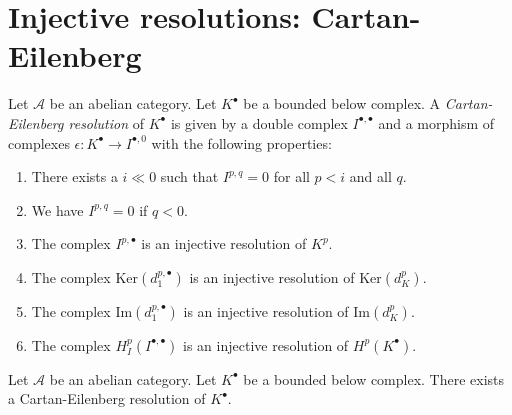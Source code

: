 \section{Injective resolutions: Cartan-Eilenberg}
\label{section-cartan-eilenberg}

\begin{definition}
\label{definition-cartan-eilenberg}
Let $\mathcal{A}$ be an abelian category.
Let $K^\bullet$ be a bounded below complex.
A {\it Cartan-Eilenberg resolution} of $K^\bullet$
is given by a double complex $I^{\bullet, \bullet}$
and a morphism of complexes $\epsilon : K^\bullet \to I^{\bullet, 0}$
with the following properties:
\begin{enumerate}
\item There exists a $i \ll 0$ such that $I^{p, q} = 0$ for all $p < i$
and all $q$.
\item We have $I^{p, q} = 0$ if $q < 0$.
\item The complex $I^{p, \bullet}$ is an injective resolution of $K^p$.
\item The complex $\text{Ker}(d_1^{p, \bullet})$ is an injective resolution
of $\text{Ker}(d_K^p)$.
\item The complex $\text{Im}(d_1^{p, \bullet})$ is an injective resolution
of $\text{Im}(d_K^p)$.
\item The complex $H^p_{I}(I^{\bullet, \bullet})$ is an injective resolution
of $H^p(K^\bullet)$.
\end{enumerate}
\end{definition}

\begin{lemma}
\label{lemma-cartan-eilenberg}
Let $\mathcal{A}$ be an abelian category.
Let $K^\bullet$ be a bounded below complex.
There exists a Cartan-Eilenberg resolution of $K^\bullet$.
\end{lemma}

